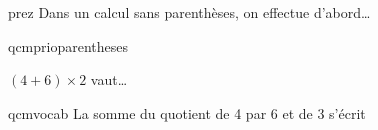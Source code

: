 \documentclass[12pt]{extarticle}
\begin{document}
{\begin{exercicebox}
    \begin{question}{prez}    
          Dans un calcul sans parenthèses, on effectue d'abord…
          \begin{reponses}
          \end{reponses}
    \end{question}

    \begin{question}{qcmprioparentheses}
        \begin{minipage}{0.20\textwidth}
            $(4+6)\times2$ vaut…
        \end{minipage}
        \hfill
        \begin{minipage}{0.60\textwidth}
            \begin{reponseshoriz}
            \end{reponseshoriz}
        \end{minipage}
    \end{question}


    \begin{question}{qcmvocab}  
        La somme du quotient de 4 par 6 et de 3 s'écrit
        \begin{reponseshoriz}
        \end{reponseshoriz}
    \end{question}

\end{exercicebox}

}   
\end{document}
